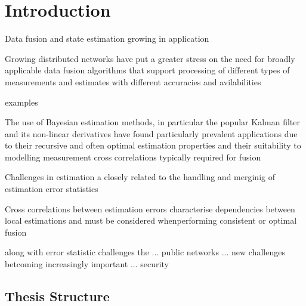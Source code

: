 
\chapter{Introduction}

Data fusion and state estimation growing in application

Growing distributed networks have put a greater stress on the need for broadly applicable data fusion algorithms that support processing of different types of measurements and estimates with different accuracies and avilabilities

examples

The use of Bayesian estimation methods, in particular the popular Kalman filter and its non-linear derivatives have found particularly prevalent applications due to their recursive and often optimal estimation properties and their suitability to modelling measurement cross correlations typically required for fusion


Challenges in estimation a closely related to the handling and merginig of estimation error statistics

Cross correlations between estimation errors characterise dependencies between local estimations and must be considered whenperforming consistent or optimal fusion


along with error statistic challenges the ... public networks ... new challenges betcoming increasingly important ... security




\section{Thesis Structure}